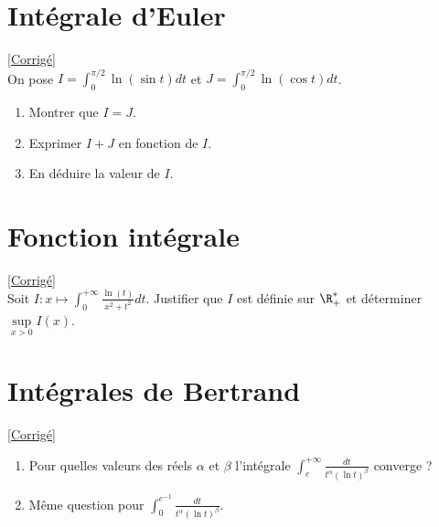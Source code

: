 \documentclass{book}
\begin{document}
	\section{Intégrale d'Euler }
	\textcolor{blue}{\hyperref[Intégrale d'Euler corrigé]{[Corrigé]}}\\
	\label{euler_1}
	\label{Intégrale d'Euler}
	On pose $I=\displaystyle\int_0^{\pi/2}\ln(\sin t)dt$ et $J=\displaystyle\int_0^{\pi/2}\ln(\cos t)dt$.
	\begin{enumerate}
		\item Montrer que $I=J$.
		\item Exprimer $I+J$ en fonction de $I$.
		\item En déduire la valeur de $I$.
	\end{enumerate}
	
	\section{Fonction intégrale }
	\textcolor{blue}{\hyperref[Fonction intégrale corrigé]{[Corrigé]}}\\
	\label{fonction_intégrale}
	\label{Fonction intégrale}
	Soit $I:x\mapsto\displaystyle\int_{0}^{+\infty} \frac{\ln(t)}{x^2+t^2}dt$. Justifier que $I$ est définie sur $\R^*_+$ et déterminer $\sup\limits_{x>0}I(x)$.
	
	\section{Intégrales de Bertrand}
	\textcolor{blue}{\hyperref[Intégrales de Bertrand corrigé]{[Corrigé]}}\\
	\label{Intégrales de Bertrand}
	\begin{enumerate}[leftmargin=*]
		\item Pour quelles valeurs des réels $\alpha$ et $\beta$ l'intégrale $\displaystyle\int_e^{+\infty}\frac{dt}{t^\alpha(\ln t)^\beta}$ converge ?
		\item Même question pour $\displaystyle\int_0^{e^{-1}}\frac{dt}{t^\alpha(\ln t)^\beta}$.
	\end{enumerate}
	
\end{document}
